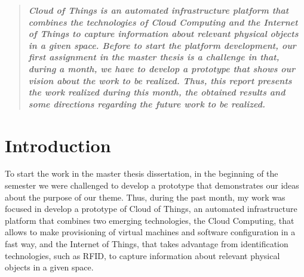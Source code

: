 \documentclass[12pt, twocolumn]{article}
\begin{document}
\begin{abstract}
\textbf{\textit{Cloud of Things is an automated infrastructure platform that combines the technologies of Cloud Computing and the Internet of Things to capture information about relevant physical objects in a given space.
Before to start the platform development, our first assignment in the master thesis is a challenge in that, during a month, we have to develop a prototype that shows our vision about the work to be realized. Thus, this report presents the work realized during this month, the obtained results and some directions regarding the future work to be realized.}}
\end{abstract}
\section{Introduction}
To start the work in the master thesis dissertation, in the beginning of the semester we were challenged to develop a prototype that demonstrates our ideas about the purpose of our theme.
Thus, during the past month, my work was focused in develop a prototype of  Cloud of Things, an automated infrastructure platform that combines two emerging technologies, the Cloud Computing, that
allows to make provisioning of virtual machines and software configuration in a fast way, and the Internet of Things, that takes advantage from identification technologies, such as RFID, to capture information about
relevant physical objects in a given space.
\end{document}
